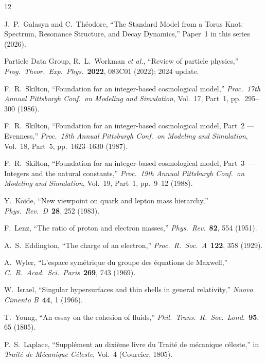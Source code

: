 \documentclass[11pt,a4paper]{article}
\begin{document}
\begin{thebibliography}{12}

J.~P.~Galasyn and C.~Th\'eodore,
``The Standard Model from a Torus Knot: Spectrum, Resonance Structure, and Decay Dynamics,''
Paper~1 in this series (2026).

Particle Data Group, R.~L.~Workman \emph{et al.},
``Review of particle physics,''
\emph{Prog.\ Theor.\ Exp.\ Phys.}\ \textbf{2022}, 083C01 (2022); 2024 update.

F.~R.~Skilton,
``Foundation for an integer-based cosmological model,''
\emph{Proc.\ 17th Annual Pittsburgh Conf.\ on Modeling and Simulation},
Vol.~17, Part~1, pp.~295--300 (1986).

F.~R.~Skilton,
``Foundation for an integer-based cosmological model, Part~2 --- Evenness,''
\emph{Proc.\ 18th Annual Pittsburgh Conf.\ on Modeling and Simulation},
Vol.~18, Part~5, pp.~1623--1630 (1987).

F.~R.~Skilton,
``Foundation for an integer-based cosmological model, Part~3 --- Integers and the natural constants,''
\emph{Proc.\ 19th Annual Pittsburgh Conf.\ on Modeling and Simulation},
Vol.~19, Part~1, pp.~9--12 (1988).

Y.~Koide,
``New viewpoint on quark and lepton mass hierarchy,''
\emph{Phys.\ Rev.\ D}\ \textbf{28}, 252 (1983).

F.~Lenz,
``The ratio of proton and electron masses,''
\emph{Phys.\ Rev.}\ \textbf{82}, 554 (1951).

A.~S.~Eddington,
``The charge of an electron,''
\emph{Proc.\ R.\ Soc.\ A}\ \textbf{122}, 358 (1929).

A.~Wyler,
``L'espace sym\'etrique du groupe des \'equations de Maxwell,''
\emph{C.\ R.\ Acad.\ Sci.\ Paris}\ \textbf{269}, 743 (1969).

W.~Israel,
``Singular hypersurfaces and thin shells in general relativity,''
\emph{Nuovo Cimento B}\ \textbf{44}, 1 (1966).

T.~Young,
``An essay on the cohesion of fluids,''
\emph{Phil.\ Trans.\ R.\ Soc.\ Lond.}\ \textbf{95}, 65 (1805).

P.~S.~Laplace,
``Suppl\'ement au dixi\`eme livre du Trait\'e de m\'ecanique c\'eleste,''
in \emph{Trait\'e de M\'ecanique C\'eleste}, Vol.~4 (Courcier, 1805).

\end{thebibliography}
\end{document}
